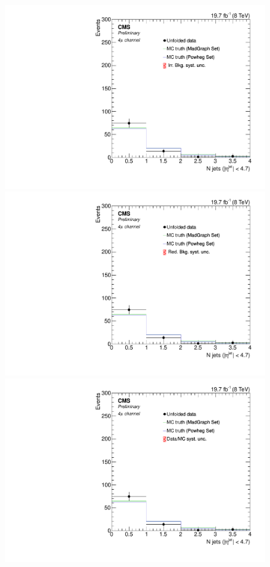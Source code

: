 \begin{figure}[hbtp]
\begin{center}
    \includegraphics[width=0.8\cmsFigWidth]{Figures/Unfolding/Systematics/ZZTo4m_Jets_IrrBkg_Mad_fr}
    \includegraphics[width=0.8\cmsFigWidth]{Figures/Unfolding/Systematics/ZZTo4m_Jets_RedBkg_Mad_fr}     
    \includegraphics[width=0.8\cmsFigWidth]{Figures/Unfolding/Systematics/ZZTo4m_Jets_UnfDataOverGenMC_Mad_fr}  

\end{center}
\end{figure}
